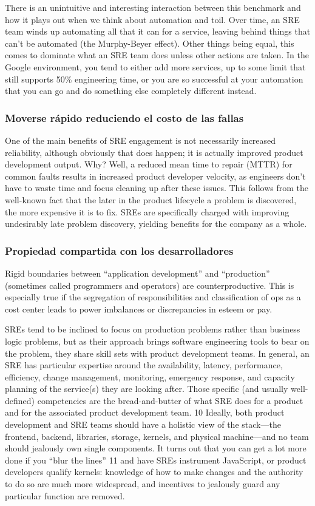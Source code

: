 There is an unintuitive and interesting interaction between this
benchmark and how it plays out when we think about automation and
toil. Over time, an SRE team winds up automating all that it can for a
service, leaving behind things that can’t be automated (the
Murphy-Beyer effect). Other things being equal, this comes to dominate
what an SRE team does unless other actions are taken. In the Google
environment, you tend to either add more services, up to some limit
that still supports 50\% engineering time, or you are so successful at
your automation that you can go and do something else completely
different instead.

\subsubsection{Moverse rápido reduciendo el costo de las fallas}

One of the main benefits of SRE engagement is not necessarily
increased reliability, although obviously that does happen; it is
actually improved product development output. Why? Well, a reduced
mean time to repair (MTTR) for common faults results in increased
product developer velocity, as engineers don’t have to waste time and
focus cleaning up after these issues. This follows from the well-known
fact that the later in the product lifecycle a problem is discovered,
the more expensive it is to fix. SREs are specifically charged with
improving undesirably late problem discovery, yielding benefits for
the company as a whole.

\subsubsection{Propiedad compartida con los desarrolladores}

Rigid boundaries between ``application development'' and ``production''
(sometimes called programmers and operators) are
counterproductive. This is especially true if the segregation of
responsibilities and classification of ops as a cost center leads to
power imbalances or discrepancies in esteem or pay.

SREs tend to be inclined to focus on production problems rather than
business logic problems, but as their approach brings software
engineering tools to bear on the problem, they share skill sets with
product development teams. In general, an SRE has particular expertise
around the availability, latency, performance, efficiency, change
management, monitoring, emergency response, and capacity planning of
the service(s) they are looking after. Those specific (and usually
well-defined) competencies are the bread-and-butter of what SRE does
for a product and for the associated product development team. 10
Ideally, both product development and SRE teams should have a holistic
view of the stack—the frontend, backend, libraries, storage, kernels,
and physical machine—and no team should jealously own single
components. It turns out that you can get a lot more done if you ``blur
the lines'' 11 and have SREs instrument JavaScript, or product
developers qualify kernels: knowledge of how to make changes and the
authority to do so are much more widespread, and incentives to
jealously guard any particular function are removed.

